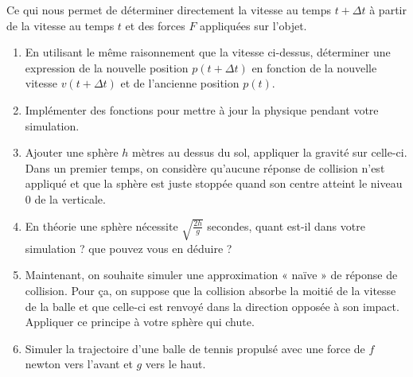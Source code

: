 \documentclass[a4paper,12pt]{article}
\begin{document}
Ce qui nous permet de déterminer directement la vitesse au temps $t+\Delta t$ à partir de la vitesse au temps $t$ et des forces $F$ appliquées sur l'objet. 


\begin{enumerate}
    \item En utilisant le même raisonnement que la vitesse ci-dessus, déterminer une expression de la nouvelle position $p(t+\Delta t)$ en fonction de la nouvelle vitesse $v(t+\Delta t)$ et de l'ancienne position $p(t)$.  
    \item Implémenter des fonctions pour mettre à jour la physique pendant votre simulation.
    \item Ajouter une sphère $h$ mètres au dessus du sol, appliquer la gravité sur celle-ci. Dans un premier temps, on considère qu'aucune réponse de collision n'est appliqué et que la sphère est juste stoppée quand son centre atteint le niveau $0$ de la verticale. 
    \item En théorie une sphère nécessite $\sqrt{\frac{2h}{g}}$ secondes, quant est-il dans votre simulation ? que pouvez vous en déduire ?
    \item Maintenant, on souhaite simuler une approximation « naïve » de réponse de collision. Pour ça, on suppose que la collision absorbe la moitié de la vitesse de la balle et que celle-ci est renvoyé dans la direction opposée à son impact. Appliquer ce principe à votre sphère qui chute.
    \item Simuler la trajectoire d'une balle de tennis propulsé avec une force de $f$ newton vers l'avant et $g$ vers le haut.
\end{enumerate}
\end{document}
